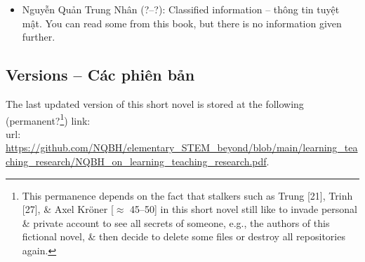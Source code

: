 \documentclass[12pt]{article}
\begin{document}
\begin{itemize}
	Hắn là kiểu sinh ra trong gia cảnh nghèo mà có tính cầu toàn khó ưa. Hắn có thể phá hủy cả 1 tác phẩm do hắn làm (hắn tôn trọng bất cứ tác phẩm nào của người khác nên không có chuyện hắn phá tác phẩm của người khác) chỉ đơn giản vì hắn không thích 1 (vài) chi tiết nào trong tác phẩm đó mà hắn không thể sửa được. Điểm này giống nhân vật {\sc Rust Cohl} trong series film \href{https://www.imdb.com/title/tt2356777/}{True Detective}:
	\begin{quotation}\it
		``Rust would pick a fight with the sky if he didn't like its shade of blue. But when we finally got him over to the house - this is when that case was hot - the bastard looks like he was on his way to firing squad.'' -- \href{https://www.imdb.com/title/tt2356777/}{True Detective} (2014--) [S1.E1].
	\end{quotation}
	\begin{itemize}
		\item CV: {\sc url}: \url{https://github.com/NQBH/publication/blob/master/CV/NQBH_CV.pdf}.
		\item Website: {\sc url}: \url{https://nqbh.github.io}.
		\item Trang web của {\it Some Topics in Elementary STEM \& Beyond -- Vài Chủ Đề Trong STEM Sơ Cấp \& Hơn Thế Nữa}: {\sc url}: \url{https://nqbh.github.io/elementary_STEM}.
		\item Trang web của {\it Some Topics in Advanced STEM \& Beyond -- Vài Chủ Đề Trong STEM Cao Cấp \& Hơn Thế Nữa}: {\sc url}: \url{https://nqbh.github.io/advanced_STEM}.
		\item E-book library -- Thư viện sách điện tử: {\sc url}: \url{https://github.com/NQBH/reference}.
		\item File bibliography.bib dùng để quản lý danh mục sách điện tử: {\sc url}: \url{https://github.com/NQBH/reference/blob/master/bib.bib}.
	\end{itemize}
	
	\item {\sc Nguyễn Quản Trung Nhân} (?--?): Classified information -- thông tin tuyệt mật. You can read some from this book, but there is no information given further.
\end{itemize}

\subsection{Versions -- Các phiên bản}
The last updated version of this short novel is stored at the following (permanent?\footnote{This permanence depends on the fact that stalkers such as Trung [21], Trinh [27], \& Axel Kr\"oner [$\approx$ 45--50] in this short novel still like to invade personal \& private account to see all secrets of someone, e.g., the authors of this fictional novel, \& then decide to delete some files or destroy all repositories again.}) link:\\{\sc url}: {\sf\small\url{https://github.com/NQBH/elementary_STEM_beyond/blob/main/learning_teaching_research/NQBH_on_learning_teaching_research.pdf}}.
\end{document}

